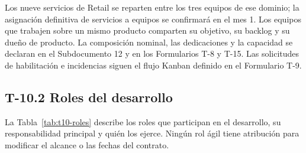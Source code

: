 \documentclass[11pt]{article}
\begin{document}
Los nueve servicios de Retail se reparten entre los tres equipos de ese dominio; la asignación definitiva de servicios a equipos se confirmará en el mes 1. Los equipos que trabajen sobre un mismo producto comparten su objetivo, su backlog y su dueño de producto. La composición nominal, las dedicaciones y la capacidad se declaran en el Subdocumento 12 y en los Formularios T-8 y T-15. Las solicitudes de habilitación e incidencias siguen el flujo Kanban definido en el Formulario T-9.

\subsection{T-10.2 Roles del desarrollo}\label{t10-2}

La Tabla~\mbox{\ref{tab:t10-roles}} describe los roles que participan en el desarrollo, su responsabilidad principal y quién los ejerce. Ningún rol ágil tiene atribución para modificar el alcance o las fechas del contrato.
\end{document}
